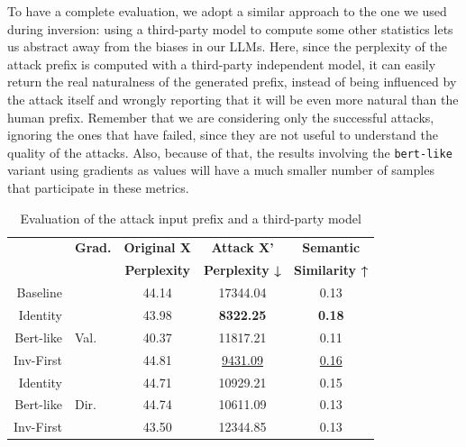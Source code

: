 \documentclass[../thesis.tex]{subfiles}
\begin{document}
To have a complete evaluation, we adopt a similar approach to the one we used during inversion:
using a third-party model to compute some other statistics lets us abstract away from the biases in our LLMs.
Here, since the perplexity of the attack prefix is computed with a third-party independent model, it can easily return the real naturalness of the generated prefix, instead of being influenced by the attack itself and wrongly reporting that it will be even more natural than the human prefix.
Remember that we are considering only the successful attacks, ignoring the ones that have failed, since they are not useful to understand the quality of the attacks. Also, because of that, the results involving the \texttt{bert-like} variant using gradients as values will have a much smaller number of samples that participate in these metrics.

\begin{table}[htbp]
\centering
\begin{tabular}{rlccc}
\toprule
           & \textbf{Grad.} & \textbf{Original X} & \textbf{Attack X'}    & \textbf{Semantic}     \\
           &                & \textbf{Perplexity} & \textbf{Perplexity ↓} & \textbf{Similarity ↑} \\
\midrule
Baseline   &                & 44.14               & 17344.04              & 0.13                  \\
\midrule
Identity   &                & 43.98               & \textbf{8322.25}      & \textbf{0.18}         \\
Bert-like  & Val.           & 40.37               & 11817.21              & 0.11                  \\
Inv-First  &                & 44.81               & \underline{9431.09}   & \underline{0.16}      \\
\midrule
Identity   &                & 44.71               & 10929.21              & 0.15                  \\
Bert-like  & Dir.           & 44.74               & 10611.09              & 0.13                  \\
Inv-First  &                & 43.50               & 12344.85              & 0.13                  \\
\bottomrule
\end{tabular}
\vspace{0.25cm}
\caption{Evaluation of the attack input prefix and a third-party model}
\label{tab:small_tinystories_ce_attack_third_party}
\end{table}
\end{document}
